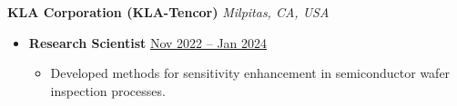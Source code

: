 {\color{red}\textbf{KLA Corporation (KLA-Tencor)} \hfill \textit{Milpitas, CA, USA}}\par
\begin{itemize}
    \item
        \textbf{Research Scientist}
        \hfill \underline{Nov 2022 -- Jan 2024} \par
        \begin{itemize}
            \item Developed methods for sensitivity enhancement in semiconductor wafer inspection processes. 
        \end{itemize}
\end{itemize}